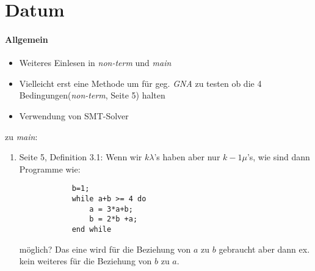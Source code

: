\section*{Datum}

\paragraph{Allgemein}
\begin{itemize}
	\item Weiteres Einlesen in \emph{non-term} und \emph{main}
	\item Vielleicht erst eine Methode um für geg. \emph{GNA} zu testen ob die 4 Bedingungen(\emph{non-term}, Seite 5) halten
	\item Verwendung von SMT-Solver 
\end{itemize}

zu \emph{main}:
\begin{enumerate}
	\item Seite 5, Definition 3.1: Wenn wir $k \lambda$'s haben aber nur $k-1 \mu$'s, wie sind dann Programme wie: 
		\begin{lstlisting}
			b=1;
			while a+b >= 4 do
				a = 3*a+b;
				b = 2*b +a;
			end while 
		\end{lstlisting}
		möglich? Das eine \mu wird für die Beziehung von $a$ zu $b$ gebraucht aber dann ex. kein weiteres \mu für die Beziehung von $b$ zu $a$.
\end{enumerate}